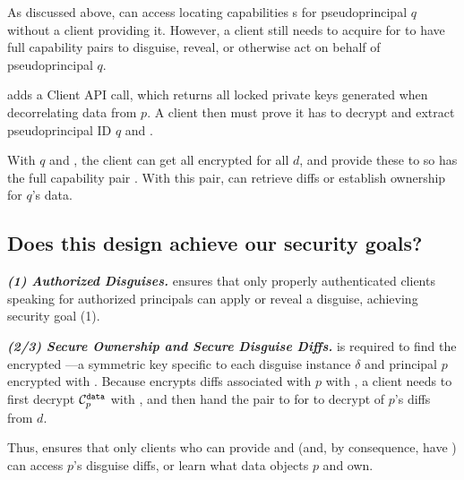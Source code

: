 
As discussed above, \sys can access locating capabilities s for pseudoprincipal $q$ without a
client providing it. 
%
However, a client still needs to acquire  for \sys to have full capability pairs
to disguise, reveal, or otherwise act on behalf of pseudoprincipal $q$.

\sys adds a  Client API call, which returns all locked private
keys  generated when decorrelating data from $p$.
A client then must prove it has  to decrypt  and extract pseudoprincipal ID $q$ and .

With $q$ and , the client can get all encrypted  for all $d$, and
provide these to \sys so \sys has the full capability pair . With
this pair, \sys can retrieve diffs or establish ownership for $q$'s data.


\subsection{Does this design achieve our security goals?}
\label{sec:achievegoals}
\vspace{6pt}\noindent\textbf{\emph{(1) Authorized Disguises.}}
\sys ensures that only properly authenticated clients speaking for authorized principals can apply or
reveal a disguise, achieving security goal (1).

\vspace{6pt}\noindent\textbf{\emph{(2/3) Secure Ownership and Secure Disguise Diffs.}}
 is required to find the encrypted ---a symmetric key
specific to each disguise instance $\delta$ and principal $p$ encrypted with .
Because \sys encrypts  diffs associated with $p$ with , a client
needs to first decrypt $\mathcal{C}^{\texttt{data}}_{p}$ with , and then hand the pair 
to \sys for \sys to decrypt of $p$'s diffs from $d$.

Thus, \sys ensures that only clients who can provide  and  (and,
by consequence, have ) can access $p$'s disguise diffs, or learn what data objects $p$ and
own. 

